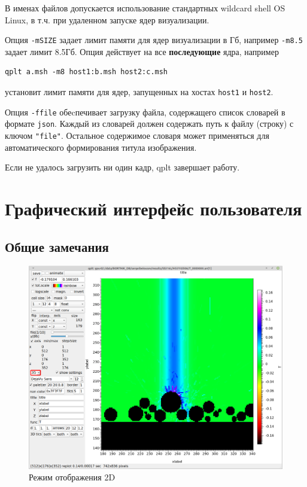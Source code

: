 \documentclass[12pt]{article}
\begin{document}
В именах файлов допускается использование стандартных wildcard shell OS Linux, в т.ч. при удаленном запуске ядер визуализации.

Опция \verb'-mSIZE' задает лимит памяти для ядер визуализации в Гб, например \verb'-m8.5' задает лимит 8.5Гб. Опция действует на все
{\bf последующие} ядра, например
\begin{verbatim}
qplt a.msh -m8 host1:b.msh host2:c.msh
\end{verbatim}
установит лимит памяти для ядер, запущенных на хостах \verb'host1' и \verb'host2'.

Опция  \verb'-ffile' обеcпечивает загрузку файла, содержащего список словарей в формате \verb'json'.
Каждый из словарей должен содержать путь к файлу (строку) с ключом \verb'"file"'.
Остальное содержимое словаря может применяться для автоматического формирования титула изображения.

Если не удалось загрузить ни один кадр, qplt завершает работу.

\section{Графический интерфейс пользователя}
\subsection{Общие замечания}
\begin{figure}[hb]
  \begin{center}
      \includegraphics[width=.7\textwidth]{picts/2D.png} 
  \end{center}
  \caption{Режим отображения 2D}\label{2D:pict}
\end{figure}
\end{document}
